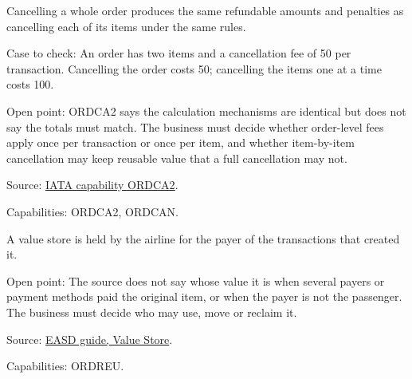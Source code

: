 \begin{theorem}
  \label{thm:change-cancellation-full-equals-items}
  \notready
  Cancelling a whole order produces the same refundable amounts and
  penalties as cancelling each of its items under the same rules.

  Case to check: An order has two items and a cancellation fee of 50 per
  transaction. Cancelling the order costs 50; cancelling the items one at a
  time costs 100.

  Open point: ORDCA2 says the calculation mechanisms are identical but does
  not say the totals must match. The business must decide whether
  order-level fees apply once per transaction or once per item, and whether
  item-by-item cancellation may keep reusable value that a full cancellation
  may not.

  Source: \href{https://retailing.iata.org/armi/docs/ORDCA2/}{IATA capability ORDCA2}.

  Capabilities: ORDCA2, ORDCAN.
\end{theorem}

\begin{theorem}
  \label{thm:change-cancellation-stored-value-payer}
  \notready
  A value store is held by the airline for the payer of the transactions
  that created it.

  Open point: The source does not say whose value it is when several payers
  or payment methods paid the original item, or when the payer is not the
  passenger. The business must decide who may use, move or reclaim it.

  Source: \href{https://standards.atlassian.net/wiki/spaces/EASD/pages/574554245}{EASD guide, Value Store}.

  Capabilities: ORDREU.
\end{theorem}
